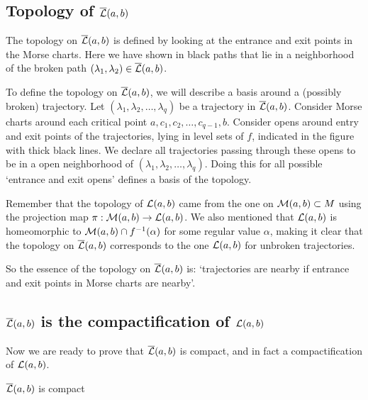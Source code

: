     


\subsection{Topology of $\overline{\mathcal L}(a, b)$}


\begin{marginfigure}
    \centering
    \caption{The topology on $\overline{\mathcal L}(a, b) $ is defined by looking at the entrance and exit points in the Morse charts.
        Here we have shown in black paths that lie in a neighborhood of the broken path $(\lambda_1, \lambda_2) \in \overline{\mathcal L}(a, b)$.
    }
    \label{fig:morse-homology-definition-of-topology}
\end{marginfigure}
To define the topology on $\overline{\mathcal L}(a, b)$,
we will describe a basis around a (possibly broken) trajectory.
Let $(\lambda_1, \lambda_2, \ldots, \lambda_q)$ be a trajectory in $\overline{\mathcal L}(a, b)$.
Consider Morse charts around each critical point  $a, c_1, c_2, \ldots, c_{q-1}, b$.
Consider opens around entry and exit points of the trajectories, lying in level sets of $f$, indicated in the figure with thick black lines.
We declare all trajectories passing through these opens to be in a open neighborhood of $(\lambda_1, \lambda_2, \ldots, \lambda_q)$.
Doing this for all possible `entrance and exit opens' defines a basis of the topology.

Remember that the topology of  $\mathcal L(a, b)$ came from the one on $\mathcal M(a, b) \subset M$ using the projection map $\pi: \mathcal M(a, b) \to \mathcal L(a, b) $.
We also mentioned that $\mathcal L(a, b)$ is homeomorphic to $\mathcal M(a, b) \cap  f^{-1}(\alpha)$ for some regular value $\alpha$, making it clear that the topology on $\overline{\mathcal L}(a, b)$ corresponds to the one  $\mathcal L(a, b)$ for unbroken trajectories.

So the essence of the topology on $\overline{\mathcal L}(a, b)$ is: `trajectories are nearby if entrance and exit points in Morse charts are nearby'.

\subsection{$\overline{\mathcal L}(a, b)$ is the compactification of $\mathcal L(a, b)$}
Now we are ready to prove that $\overline{\mathcal L}(a, b)$ is compact, and in fact a compactification of  $\mathcal L(a, b)$.
\begin{theorem}
    $\overline{\mathcal L}(a, b)$ is compact
\end{theorem}


